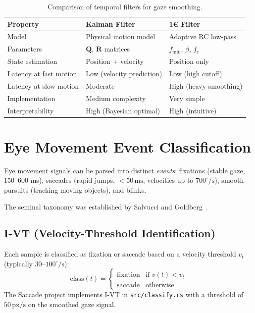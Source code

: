 \documentclass[11pt,a4paper]{article}
\begin{document}
\begin{table}[H]
  \centering
  \caption{Comparison of temporal filters for gaze smoothing.}
  \begin{tabular}{lll}
    \toprule
    Property & Kalman Filter & 1\euro{} Filter \\
    \midrule
    Model & Physical motion model & Adaptive RC low-pass \\
    Parameters & $\mathbf{Q}$, $\mathbf{R}$ matrices & $f_{\min}$, $\beta$, $f_c$ \\
    State estimation & Position + velocity & Position only \\
    Latency at fast motion & Low (velocity prediction) & Low (high cutoff) \\
    Latency at slow motion & Moderate & High (heavy smoothing) \\
    Implementation & Medium complexity & Very simple \\
    Interpretability & High (Bayesian optimal) & High (intuitive) \\
    \bottomrule
  \end{tabular}
\end{table}

\section{Eye Movement Event Classification}
\label{sec:event}

Eye movement signals can be parsed into distinct \textit{events}: fixations (stable gaze, 150--600 ms), saccades (rapid jumps, $<50\,\text{ms}$, velocities up to $700^\circ/\text{s}$), smooth pursuits (tracking moving objects), and blinks.

The seminal taxonomy was established by Salvucci and Goldberg~\cite{salvucci2000identifying}.

\subsection{I-VT (Velocity-Threshold Identification)}

Each sample is classified as fixation or saccade based on a velocity threshold $v_t$ (typically $30$--$100^\circ/\text{s}$):
\begin{equation}
  \text{class}(t) = \begin{cases} \text{fixation} & \text{if } v(t) < v_t \\ \text{saccade} & \text{otherwise}. \end{cases}
\end{equation}
The Saccade project implements I-VT in \texttt{src/classify.rs} with a threshold of $50\,\text{px/s}$ on the smoothed gaze signal.
\end{document}
